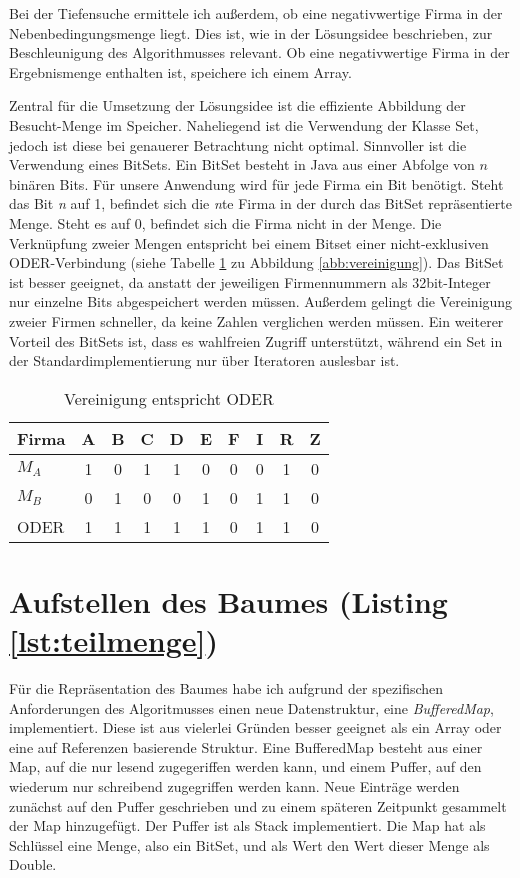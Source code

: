 Bei der Tiefensuche ermittele ich außerdem, ob eine negativwertige Firma in der Nebenbedingungsmenge liegt. Dies ist, wie in der Lösungsidee beschrieben, zur Beschleunigung des Algorithmusses relevant. Ob eine negativwertige Firma in der Ergebnismenge enthalten ist, speichere ich einem Array.

Zentral für die Umsetzung der Lösungsidee ist die effiziente Abbildung der Besucht-Menge im Speicher. Naheliegend ist die Verwendung der Klasse Set, jedoch ist diese bei genauerer Betrachtung nicht optimal. Sinnvoller ist die Verwendung eines BitSets. Ein BitSet besteht in Java aus einer Abfolge von \(n\) binären Bits. Für unsere Anwendung wird für jede Firma ein Bit benötigt.
Steht das Bit \textit{n} auf 1, befindet sich die \textit{n}te Firma in der durch das BitSet repräsentierte Menge. Steht es auf 0, befindet sich die Firma nicht in der Menge.
Die Verknüpfung zweier Mengen entspricht bei einem Bitset einer nicht-exklusiven ODER-Verbindung (siehe Tabelle \ref{tab:veroder} zu Abbildung \ref{abb:vereinigung}).
Das BitSet ist besser geeignet, da anstatt der jeweiligen Firmennummern als 32bit-Integer nur einzelne Bits abgespeichert werden müssen. Außerdem gelingt die Vereinigung zweier Firmen schneller, da keine Zahlen verglichen werden müssen. Ein weiterer Vorteil des BitSets ist, dass es wahlfreien Zugriff unterstützt, während ein Set in der Standardimplementierung nur über Iteratoren auslesbar ist.
\begin{table}
	\centering
    \begin{tabular}{l|ccccccccc}
    Firma 	& A & B & C & D & E & F & I & R & Z \\ \hline
    \(M_A\)	& 1 & 0 & 1 & 1 & 0 & 0 & 0 & 1 & 0 \\
    \(M_B\)	& 0 & 1 & 0 & 0 & 1 & 0 & 1 & 1 & 0 \\ \hhline{=|*{9}{=}}
    ODER 	& 1 & 1 & 1 & 1 & 1 & 0 & 1 & 1 & 0 \\
    \end{tabular}
    \caption {Vereinigung entspricht ODER}
    \label{tab:veroder}
\end{table}

\section{Aufstellen des Baumes (Listing \ref{lst:teilmenge})}
Für die Repräsentation des Baumes habe ich aufgrund der spezifischen Anforderungen des Algoritmusses einen neue Datenstruktur, eine \textit{BufferedMap}, implementiert. Diese ist aus vielerlei Gründen besser geeignet als ein Array oder eine auf Referenzen basierende Struktur.
Eine BufferedMap besteht aus einer Map, auf die nur lesend zugegeriffen werden kann, und einem Puffer, auf den wiederum nur schreibend zugegriffen werden kann. Neue Einträge werden zunächst auf den Puffer geschrieben und zu einem späteren Zeitpunkt gesammelt der Map hinzugefügt. Der Puffer ist als Stack implementiert. Die Map hat als Schlüssel eine Menge, also ein BitSet, und als Wert den Wert dieser Menge als Double.

